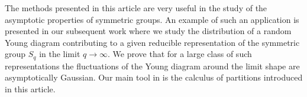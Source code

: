 \documentclass[12pt,dvips]{amsart}
\numberwithin{equation}{section} \numberwithin{figure}{section}
\theoremstyle{plain}
\theoremstyle{definition}
\theoremstyle{remark}
\newcommand{\Sn}[1]{{{S}}_{#1}}
\begin{document}
The methods presented in this article are very useful in the study
of the asymptotic properties of symmetric groups. An example of such
an application is presented in our subsequent work
\cite{Sniady2005GaussuanFluctuationsofYoungdiagrams} where we study
the distribution of a random Young diagram contributing to a given
reducible representation of the symmetric group $S_q$ in the limit
$q\to\infty$. We prove that for a large class of such
representations the fluctuations of the Young diagram around the
limit shape are asymptotically Gaussian. Our main tool in
\cite{Sniady2005GaussuanFluctuationsofYoungdiagrams} is the calculus
of partitions introduced in this article.



%
\end{document}
